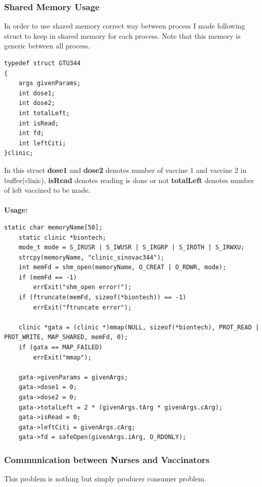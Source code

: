 \documentclass{article}
\begin{document}
\subsubsection{Shared Memory Usage}
In order to use shared memory correct way between process I made following struct to keep in shared memory for each process.
Note that this memory is generic between all process.
\begin{lstlisting}[style=CStyle]
typedef struct GTU344
{
    args givenParams;
    int dose1;
    int dose2;
    int totalLeft;
    int isRead;
    int fd;
    int leftCiti;
}clinic;
\end{lstlisting}
In this struct \textbf{dose1} and \textbf{dose2} denotes number of vaccine 1 and vaccine 2 in buffer(clinic), 
\textbf{isRead} denotes reading is done or not \textbf{totalLeft} denotes number of 
left vaccined to be made.\\ \\
\cleardoublepage
\textbf{Usage:}
\begin{lstlisting}[style=CStyle]
    static char memoryName[50];
    static clinic *biontech;
    mode_t mode = S_IRUSR | S_IWUSR | S_IRGRP | S_IROTH | S_IRWXU;
    strcpy(memoryName, "clinic_sinovac344");
    int memFd = shm_open(memoryName, O_CREAT | O_RDWR, mode);
    if (memFd == -1)
        errExit("shm_open error!");
    if (ftruncate(memFd, sizeof(*biontech)) == -1)
        errExit("ftruncate error");

    clinic *gata = (clinic *)mmap(NULL, sizeof(*biontech), PROT_READ | PROT_WRITE, MAP_SHARED, memFd, 0);
    if (gata == MAP_FAILED)
        errExit("mmap");

    gata->givenParams = givenArgs;
    gata->dose1 = 0;
    gata->dose2 = 0;
    gata->totalLeft = 2 * (givenArgs.tArg * givenArgs.cArg);
    gata->isRead = 0;
    gata->leftCiti = givenArgs.cArg;
    gata->fd = safeOpen(givenArgs.iArg, O_RDONLY);
\end{lstlisting}
\subsubsection{Communication between Nurses and Vaccinators}
This problem is nothing but simply producer consumer problem.
\end{document}
